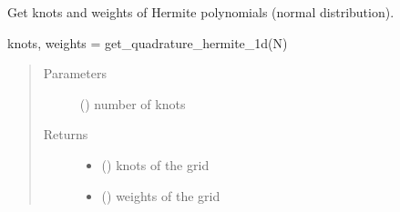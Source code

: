 \documentclass[letterpaper,10pt,english,openany,oneside]{sphinxmanual}
\begin{document}
\begin{fulllineitems}
\label{\detokenize{pygpc:pygpc.grid.get_quadrature_hermite_1d}}
Get knots and weights of Hermite polynomials (normal distribution).

knots, weights = get\_quadrature\_hermite\_1d(N)
\begin{quote}\begin{description}
\item[{Parameters}] \leavevmode
{} () \textendash{} number of knots

\item[{Returns}] \leavevmode
\begin{itemize}
\item {} 
 () \textendash{} knots of the grid

\item {} 
 () \textendash{} weights of the grid

\end{itemize}


\end{description}\end{quote}

\end{fulllineitems}

\end{document}
